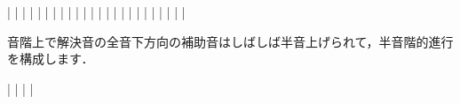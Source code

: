 \documentclass[dvipdfmx,uplatex,b5paper,openany,jbase=12Q,nomag*,textwidth-limit=44%
               ]{gachimuchi}
\begin{document}
\begin{Music}
  \generalmeter{\meterC}%
  \Startpiece%
  \NOtes%
  |\zchordsu{\Cross}%
  \en\NOTes%
  |%
  \en\doublebar%
  \NOtes%
  |\zchordsu{\Cross}%
  \en\NOTes%
  |%
  \en\doublebar%
  \NOtes%
  |\zchordsu{\Cross}%
  \en\NOTes%
  |%
  \en\doublebar%
  \NOtes%
  |\zchordsu{\Cross}%
  \en\NOTes%
  |%
  \en\doublebar%
  \NOtes%
  |\zchordsu{\Cross}%
  \en\NOTes%
  |%
  \en\doublebar%
  \NOtes%
  |\zchordsu{\Cross}%
  \en\NOTes%
  |%
  \en\setdoublebar%
  \endpiece%
  \generalmeter{\meterC}%
  \Startpiece%
  \NOtes%
  |\zchordsu{\Cross}%
  \en\NOTes%
  |%
  \en\doublebar%
  \NOtes%
  |\zchordsu{\Cross}%
  \en\NOTes%
  |%
  \en\doublebar%
  \NOtes%
  |\zchordsu{\Cross}%
  \en\NOTes%
  |%
  \en\doublebar%
  \NOtes%
  |\zchordsu{\Cross}%
  \en\NOTes%
  |%
  \en\doublebar%
  \NOtes%
  |\zchordsu{\Cross}%
  \en\NOTes%
  |%
  \en\doublebar%
  \NOtes%
  |\zchordsu{\Cross}%
  \en\NOTes%
  |%
  \en\setdoublebar%
  \endpiece%
\end{Music}

音階上で解決音の全音下方向の補助音はしばしば半音上げられて，半音階的進行を構成します．
\begin{Music}[.6\linewidth]
  \generalmeter{\meterC}%
  \Startpiece%
  \NOtes%
  |%
  \en\NOTes%
  |%
  \en\doublebar%
  \NOtes%
  |%
  \en\NOTes%
  |%
  \en\setdoublebar%
  \endpiece%
\end{Music}
\end{document}

